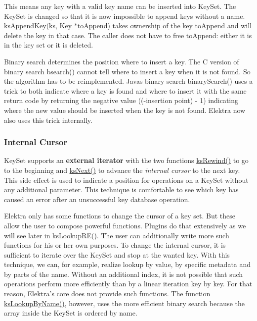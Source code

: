 This means any key with a valid key name can be inserted into {\ttfamily Key\+Set}. The {\ttfamily Key\+Set} is changed so that it is now impossible to append keys without a name. {\ttfamily ks\+Append\+Key(ks, Key $\ast$to\+Append)} takes ownership of the key {\ttfamily to\+Append} and will delete the key in that case. The caller does not have to free {\ttfamily to\+Append}\+: either it is in the key set or it is deleted.

Binary search determines the position where to insert a key. The C version of binary search {\ttfamily bsearch()} cannot tell where to insert a key when it is not found. So the algorithm has to be reimplemented. Java\textquotesingle{}s binary search {\ttfamily binary\+Search()} uses a trick to both indicate where a key is found and where to insert it with the same return code by returning the negative value {\ttfamily ((-\/insertion point) -\/ 1)} indicating where the new value should be inserted when the key is not found. Elektra now also uses this trick internally.

\subsubsection*{Internal Cursor}

{\ttfamily Key\+Set} supports an {\bfseries external iterator} with the two functions {\ttfamily \hyperlink{group__keyset_gabe793ff51f1728e3429c84a8a9086b70}{ks\+Rewind()}} to go to the beginning and {\ttfamily \hyperlink{group__keyset_ga317321c9065b5a4b3e33fe1c399bcec9}{ks\+Next()}} to advance the {\itshape internal cursor} to the next key. This side effect is used to indicate a position for operations on a {\ttfamily Key\+Set} without any additional parameter. This technique is comfortable to see which key has caused an error after an unsuccessful key database operation.

Elektra only has some functions to change the cursor of a key set. But these allow the user to compose powerful functions. Plugins do that extensively as we will see later in {\ttfamily ks\+Lookup\+R\+E()}. The user can additionally write more such functions for his or her own purposes. To change the internal cursor, it is sufficient to iterate over the {\ttfamily Key\+Set} and stop at the wanted key. With this technique, we can, for example, realize lookup by value, by specific metadata and by parts of the name. Without an additional index, it is not possible that such operations perform more efficiently than by a linear iteration key by key. For that reason, Elektra’s core does not provide such functions. The function {\ttfamily \hyperlink{group__keyset_gad2e30fb6d4739d917c5abb2ac2f9c1a1}{ks\+Lookup\+By\+Name()}}, however, uses the more efficient binary search because the array inside the {\ttfamily Key\+Set} is ordered by name.

